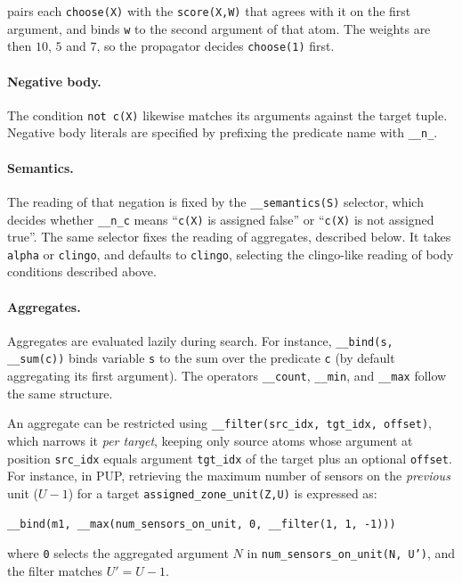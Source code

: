 pairs each \texttt{choose(X)} with the \texttt{score(X,W)} that agrees with it on the first argument, and binds \texttt{w} to the second argument of that atom. The weights are then $10$, $5$ and $7$, so the propagator decides \texttt{choose(1)} first.

\paragraph{Negative body.} The condition \texttt{not c(X)} likewise matches its arguments against the target tuple. Negative body literals are specified by prefixing the predicate name with \texttt{\_\_n\_}.

\paragraph{Semantics.} The reading of that negation is fixed by the \texttt{\_\_semantics(S)} selector, which decides whether \texttt{\_\_n\_c} means \enquote{\texttt{c(X)} is assigned false} or \enquote{\texttt{c(X)} is not assigned true}. The same selector fixes the reading of aggregates, described below. It takes \texttt{alpha} or \texttt{clingo}, and defaults to \texttt{clingo}, selecting the clingo-like reading of body conditions described above.

\paragraph{Aggregates.} Aggregates are evaluated lazily during search. For instance, \texttt{\_\_bind(s, \_\_sum(c))} binds variable \texttt{s} to the sum over the predicate \texttt{c} (by default aggregating its first argument). The operators \texttt{\_\_count}, \texttt{\_\_min}, and \texttt{\_\_max} follow the same structure.

An aggregate can be restricted using \texttt{\_\_filter(src\_idx, tgt\_idx, offset)}, which narrows it \emph{per target}, keeping only source atoms whose argument at position \texttt{src\_idx} equals argument \texttt{tgt\_idx} of the target plus an optional \texttt{offset}. For instance, in PUP, retrieving the maximum number of sensors on the \emph{previous} unit ($U-1$) for a target \texttt{assigned\_zone\_unit(Z,U)} is expressed as:
\begin{verbatim}
__bind(m1, __max(num_sensors_on_unit, 0, __filter(1, 1, -1)))
\end{verbatim}
where \texttt{0} selects the aggregated argument $N$ in \texttt{num\_sensors\_on\_unit(N, U')}, and the filter matches $U' = U - 1$.

